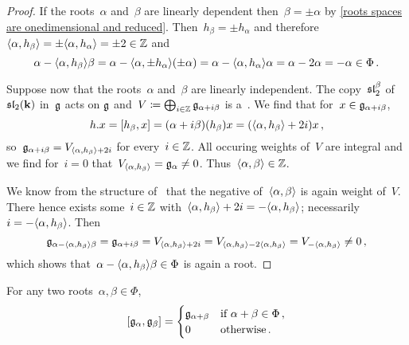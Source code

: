 \begin{proof}
  If the roots~$\alpha$ and~$\beta$ are linearly dependent then~$\beta = \pm \alpha$ by \cref{roots spaces are onedimensional and reduced}.
  Then~$h_\beta = \pm h_\alpha$ and therefore~$\langle\alpha, h_\beta\rangle = \pm \langle\alpha, h_\alpha\rangle = \pm 2 \in \mathbb{Z}$ and
  \[
    \alpha - \langle\alpha, h_\beta\rangle \beta
    =
    \alpha - \langle\alpha, \pm h_\alpha\rangle (\pm \alpha)
    =
    \alpha - \langle\alpha, h_\alpha\rangle \alpha
    =
    \alpha - 2 \alpha
    =
    -\alpha \in \Phi  \,.
  \]
 
  Suppose now that the roots~$\alpha$ and~$\beta$ are linearly independent.
  The copy~$\mathfrak{sl}_2^\beta$ of~$\mathfrak{sl}_2(\mathbf{k})$ in~$\mathfrak{g}$ acts on $\mathfrak{g}$ and~$V \coloneqq \bigoplus_{i \in \mathbb{Z}} \mathfrak{g}_{\alpha+i\beta}$ is a~{}.
  We find that for~$x \in \mathfrak{g}_{\alpha + i \beta}$,
  \[
    h.x
    =
    [h_\beta, x]
    =
    (\alpha + i\beta)(h_\beta)x
    =
    (\langle\alpha, h_\beta\rangle + 2i) x \,,
  \]
  so~$\mathfrak{g}_{\alpha+i\beta} = V_{\langle\alpha, h_\beta\rangle+2i}$ for every~$i \in \mathbb{Z}$.
  All occuring weights of~$V$ are integral and we find for~$i = 0$ that~$V_{\langle\alpha, h_\beta\rangle} = \mathfrak{g}_\alpha \neq 0$.
  Thus~$\langle\alpha, \beta\rangle \in \mathbb{Z}$.
  
  We know from the structure of~{} that the negative of~$\langle\alpha, \beta\rangle$ is again weight of~$V$.
  There hence exists some~$i \in \mathbb{Z}$ with~$\langle\alpha, h_\beta\rangle + 2i = -\langle\alpha, h_\beta\rangle$;
  necessarily~$i = -\langle\alpha, h_\beta\rangle$.
  Then
  \[
    \mathfrak{g}_{\alpha - \langle\alpha, h_\beta\rangle \beta}
    =
    \mathfrak{g}_{\alpha + i \beta}
    =
    V_{\langle\alpha, h_\beta\rangle+2i}
    =
    V_{\langle\alpha, h_\beta\rangle - 2\langle\alpha, h_\beta\rangle}
    =
    V_{-\langle\alpha, h_\beta\rangle}
    \neq
    0 \,,
  \]
  which shows that~$\alpha - \langle\alpha, h_\beta\rangle \beta \in \Phi$ is again a root.
\end{proof}


\begin{corollary}
  For any two roots~$\alpha, \beta \in \Phi$,
  \[
    [\mathfrak{g}_\alpha, \mathfrak{g}_\beta]
    =
    \begin{cases}
    \mathfrak{g}_{\alpha+\beta}  & \text{if $\alpha+\beta \in \Phi$} \,, \\
    0                     & \text{otherwise}  \,.
    \end{cases}
  \]
\end{corollary}


